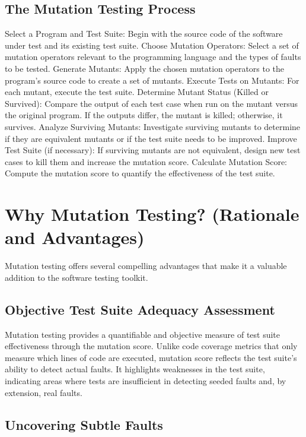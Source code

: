 \documentclass[sigplan, nonacm]{acmart}
\begin{document}
\subsection{The Mutation Testing Process}

Select a Program and Test Suite: Begin with the source code of the software under test and its existing test suite.
Choose Mutation Operators: Select a set of mutation operators relevant to the programming language and the types of faults to be tested.
Generate Mutants: Apply the chosen mutation operators to the program's source code to create a set of mutants.
Execute Tests on Mutants: For each mutant, execute the test suite.
Determine Mutant Status (Killed or Survived): Compare the output of each test case when run on the mutant versus the original program. If the outputs differ, the mutant is killed; otherwise, it survives.
Analyze Surviving Mutants: Investigate surviving mutants to determine if they are equivalent mutants or if the test suite needs to be improved.
Improve Test Suite (if necessary): If surviving mutants are not equivalent, design new test cases to kill them and increase the mutation score.
Calculate Mutation Score: Compute the mutation score to quantify the effectiveness of the test suite.

\section{Why Mutation Testing? (Rationale and Advantages)}

Mutation testing offers several compelling advantages that make it a valuable addition to the software testing toolkit.

\subsection{Objective Test Suite Adequacy Assessment}

Mutation testing provides a quantifiable and objective measure of test suite effectiveness through the mutation score. Unlike code coverage metrics that only measure which lines of code are executed, mutation score reflects the test suite's ability to detect actual faults.
It highlights weaknesses in the test suite, indicating areas where tests are insufficient in detecting seeded faults and, by extension, real faults.
\subsection{Uncovering Subtle Faults}
\end{document}
